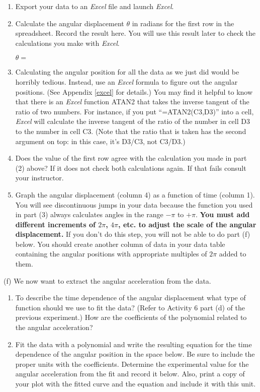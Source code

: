\begin{enumerate}
\item Export your data to an \textit{Excel} file and launch 
\textit{Excel}.

\item Calculate the angular displacement \( \theta  \) in radians for the first row
in the spreadsheet. Record the result here.
You will use this result later to check the calculations you make with 
\textit{Excel}.
\bigskip


$\theta =$
\bigskip

\item Calculating the angular position for all the data as we just did
would be horribly tedious. Instead, use an {\it Excel} formula to
figure out the angular positions.  (See Appendix \ref{excel} for details.)
You may find it helpful to know that there is an {\it Excel} function
ATAN2 that takes the inverse tangent of the ratio of two numbers.
For instance, if you put ``=ATAN2(C3,D3)'' into a cell, {\it Excel}
will calculate the inverse tangent of the ratio of the number
in cell D3 to the number in cell C3.  (Note that the ratio
that is taken has the second argument on top: in this case, it's 
D3/C3, not C3/D3.)

\item Does the value of the first row agree with the calculation you made in part
(2) above? If it does not check both calculations again. If that fails consult
your instructor. 
\item Graph the angular displacement (column 4) as a function of time (column 1).
You will see discontinuous jumps in your data because the function you used
in part (3) always calculates angles in the range \( -\pi  \) to \( +\pi  \).
\textbf{You must add different increments of \( 2\pi  \), \(4 \pi  \), etc. to adjust
the scale of the angular displacement.} If you don't do this step, you will not be able to do part (f) below.  You should create another
column of data in your data table containing the angular positions with
appropriate multiples of $2\pi$ added to them.
\end{enumerate}
(f) We now want to extract the angular acceleration from the data.

\begin{enumerate}
\item To describe the time dependence of the angular displacement what type of 
function should we use to fit the data? (Refer to Activity 6 part (d) of the 
previous experiment.) How are the coefficients of the polynomial related to 
the angular acceleration?
\answerspace{30mm}


\pagebreak[2]
\item Fit the data with a polynomial and write the resulting equation for the 
time dependence of the angular position in the space below. Be sure to include 
the proper units with the coefficients. Determine the experimental value for the
angular acceleration from the fit and record it below. Also, print a copy of
your plot with the fitted curve and the equation and include it with this unit.
\vspace{50mm}

\end{enumerate}


